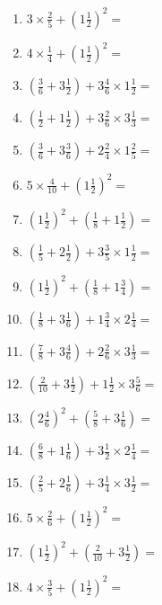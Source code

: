 \documentclass[12pt]{article}
\begin{document}
\begin{enumerate}
\item \large $ 3 \times \frac{2}{5} + (1 \frac{1}{2})^2 = $ \vspace{1.8cm}
\item \large $ 4 \times \frac{1}{4} + (1 \frac{1}{2})^2 = $ \vspace{1.8cm}
\item \large $ (\frac{3}{6} + 3 \frac{1}{2}) + 3 \frac{4}{6} \times 1 \frac{1}{2} = $ \vspace{1.8cm}
\item \large $ (\frac{1}{2} + 1 \frac{1}{2}) + 3 \frac{2}{6} \times 3 \frac{1}{3} = $ \vspace{1.8cm}
\item \large $ (\frac{3}{6} + 3 \frac{3}{6}) + 2 \frac{2}{4} \times 1 \frac{2}{5} = $ \vspace{1.8cm}
\item \large $ 5 \times \frac{4}{10} + (1 \frac{1}{2})^2 = $ \vspace{1.8cm}
\item \large $ (1 \frac{1}{2})^2 + (\frac{1}{8} + 1 \frac{1}{2}) = $ \vspace{1.8cm}
\item \large $ (\frac{1}{5} + 2 \frac{1}{2}) + 3 \frac{3}{5} \times 1 \frac{1}{2} = $ \vspace{1.8cm}
\newpage
\item \large $ (1 \frac{1}{2})^2 + (\frac{1}{8} + 1 \frac{3}{4}) = $ \vspace{1.8cm}
\item \large $ (\frac{1}{8} + 3 \frac{1}{6}) + 1 \frac{3}{4} \times 2 \frac{1}{4} = $ \vspace{1.8cm}
\item \large $ (\frac{7}{8} + 3 \frac{4}{6}) + 2 \frac{2}{6} \times 3 \frac{1}{3} = $ \vspace{1.8cm}
\item \large $ (\frac{2}{10} + 3 \frac{1}{2}) + 1 \frac{1}{2} \times 3 \frac{5}{6} = $ \vspace{1.8cm}
\item \large $ (2 \frac{4}{6})^2 + (\frac{5}{8} + 3 \frac{1}{6}) = $ \vspace{1.8cm}
\item \large $ (\frac{6}{8} + 1 \frac{1}{6}) + 3 \frac{1}{2} \times 2 \frac{1}{4} = $ \vspace{1.8cm}
\item \large $ (\frac{2}{5} + 2 \frac{1}{6}) + 3 \frac{1}{4} \times 3 \frac{1}{2} = $ \vspace{1.8cm}
\item \large $ 5 \times \frac{2}{6} + (1 \frac{1}{2})^2 = $ \vspace{1.8cm}
\item \large $ (1 \frac{1}{2})^2 + (\frac{2}{10} + 3 \frac{1}{2}) = $ \vspace{1.8cm}
\item \large $ 4 \times \frac{3}{5} + (1 \frac{1}{2})^2 = $ \vspace{1.8cm}
\end{enumerate}\newpage
\end{document}
